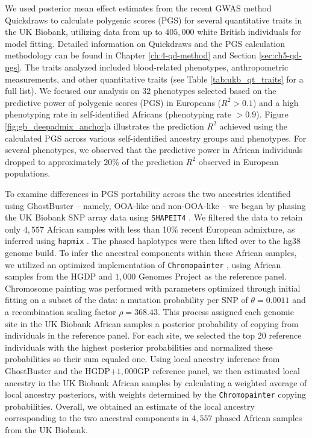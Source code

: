 We used posterior mean effect estimates from the recent GWAS method Quickdraws to calculate polygenic scores (PGS) for several quantitative traits in the UK Biobank, utilizing data from up to $405{,}000$ white British individuals for model fitting. Detailed information on Quickdraws and the PGS calculation methodology can be found in Chapter \ref{ch:4-qd-method} and Section \ref{sec:ch5-qd-pgs}. The traits analyzed included blood-related phenotypes, anthropometric measurements, and other quantitative traits (see Table \ref{tab:ukb_qt_traits} for a full list). We focused our analysis on $32$ phenotypes selected based on the predictive power of polygenic scores (PGS) in Europeans ($R^2 > 0.1$) and a high phenotyping rate in self-identified Africans (phenotyping rate $> 0.9$). Figure \ref{fig:gb_deepadmix_anchor}a illustrates the prediction $R^2$ achieved using the calculated PGS across various self-identified ancestry groups and phenotypes. For several phenotypes, we observed that the predictive power in African individuals dropped to approximately $20\%$ of the prediction $R^2$ observed in European populations.


To examine differences in PGS portability across the two ancestries identified using GhostBuster -- namely, OOA-like and non-OOA-like -- we began by phasing the UK Biobank SNP array data using \texttt{SHAPEIT4} \cite{delaneau2019accurate}. We filtered the data to retain only $4{,}557$ African samples with less than 10\% recent European admixture, as inferred using \texttt{hapmix} \cite{price2009sensitive,hu2023leveraging}. The phased haplotypes were then lifted over to the hg38 genome build. To infer the ancestral components within these African samples, we utilized an optimized implementation of \texttt{Chromopainter} \cite{Lawson2012}, using African samples from the HGDP and $1{,}000$ Genomes Project as the reference panel. Chromosome painting was performed with parameters optimized through initial fitting on a subset of the data: a mutation probability per SNP of $\theta = 0.0011$ and a recombination scaling factor $\rho = 368.43$. This process assigned each genomic site in the UK Biobank African samples a posterior probability of copying from individuals in the reference panel. For each site, we selected the top 20 reference individuals with the highest posterior probabilities and normalized these probabilities so their sum equaled one. Using local ancestry inference from GhostBuster and the HGDP+$1{,}000$GP reference panel, we then estimated local ancestry in the UK Biobank African samples by calculating a weighted average of local ancestry posteriors, with weights determined by the \texttt{Chromopainter} copying probabilities. Overall, we obtained an estimate of the local ancestry corresponding to the two ancestral components in $4{,}557$ phased African samples from the UK Biobank. 

